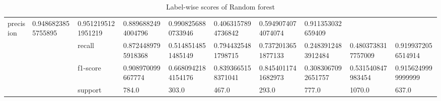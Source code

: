 \begin{table}[h!]
{\begin{tabular}{@{}ccllllllll@{}}
  \multicolumn{1}{l|}{precision} &
  \multicolumn{1}{l|}{0.9486823855755895} &
  \multicolumn{1}{l|}{0.9512195121951219} &
  \multicolumn{1}{l|}{0.8896882494004796} &
  \multicolumn{1}{l|}{0.9908256880733946} &
  \multicolumn{1}{l|}{0.4063157894736842} &
  \multicolumn{1}{l|}{0.5949074074074074} &
  \multicolumn{1}{l|}{0.911353032659409} \\ \cmidrule(l){3-10} 
\multicolumn{1}{|c|}{} &
  \multicolumn{1}{c|}{} &
  \multicolumn{1}{l|}{recall} &
  \multicolumn{1}{l|}{0.8724489795918368} &
  \multicolumn{1}{l|}{0.5148514851485149} &
  \multicolumn{1}{l|}{0.7944325481798715} &
  \multicolumn{1}{l|}{0.7372013651877133} &
  \multicolumn{1}{l|}{0.2483912483912484} &
  \multicolumn{1}{l|}{0.4803738317757009} &
  \multicolumn{1}{l|}{0.9199372056514914} \\ \cmidrule(l){3-10} 
\multicolumn{1}{|c|}{} &
  \multicolumn{1}{c|}{} &
  \multicolumn{1}{l|}{f1-score} &
  \multicolumn{1}{l|}{0.908970099667774} &
  \multicolumn{1}{l|}{0.6680942184154176} &
  \multicolumn{1}{l|}{0.8393665158371041} &
  \multicolumn{1}{l|}{0.8454011741682973} &
  \multicolumn{1}{l|}{0.3083067092651757} &
  \multicolumn{1}{l|}{0.531540847983454} &
  \multicolumn{1}{l|}{0.9156249999999999} \\ \cmidrule(l){3-10} 
\multicolumn{1}{|c|}{} &
  \multicolumn{1}{c|}{} &
  \multicolumn{1}{l|}{support} &
  \multicolumn{1}{l|}{784.0} &
  \multicolumn{1}{l|}{303.0} &
  \multicolumn{1}{l|}{467.0} &
  \multicolumn{1}{l|}{293.0} &
  \multicolumn{1}{l|}{777.0} &
  \multicolumn{1}{l|}{1070.0} &
  \multicolumn{1}{l|}{637.0} \\ \bottomrule
\end{tabular}%
}
\caption{Label-wise scores of Random forest}
\label{tab:Label-wise-random-forest}
\end{table}


